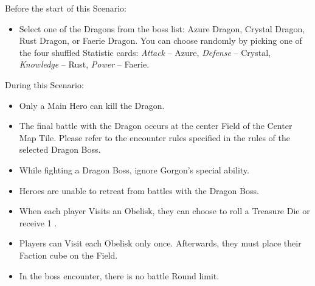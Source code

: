 \begin{multicols*}{2}
Before the start of this Scenario:

\begin{itemize}
  \item Select one of the Dragons from the boss list: Azure Dragon, Crystal Dragon, Rust Dragon, or Faerie Dragon.
    You can choose randomly by picking one of the four shuffled Statistic cards: \textit{Attack} -- Azure, \textit{Defense} -- Crystal, \textit{Knowledge} -- Rust, \textit{Power} -- Faerie.
\end{itemize}

During this Scenario:

\begin{itemize}
  \item Only a Main Hero can kill the Dragon.
  \item The final battle with the Dragon occurs at the center Field of the Center Map Tile.
    Please refer to the encounter rules specified in the rules of the selected Dragon Boss.
  \item While fighting a Dragon Boss, ignore Gorgon's special ability.
  \item Heroes are unable to retreat from battles with the Dragon Boss.
  \item When each player Visits an Obelisk, they can choose to roll a Treasure Die or receive 1 .
  \item Players can Visit each Obelisk only once.
    Afterwards, they must place their Faction cube on the Field.
  \item In the boss encounter, there is no battle Round limit.
\end{itemize}


\end{multicols*}

\clearpage

